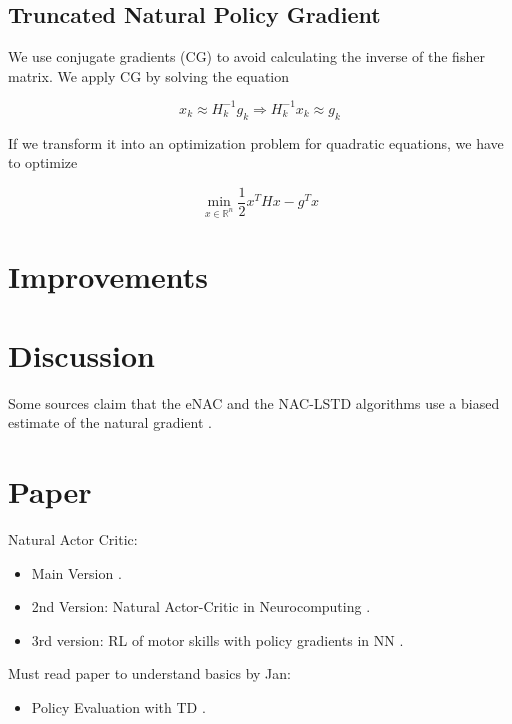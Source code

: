 	\subsection{Truncated Natural Policy Gradient}
	
	We use conjugate gradients (CG) to avoid calculating the inverse of the fisher matrix. We apply CG by solving the equation
	
	\begin{equation}
		x_k \approx H_k^{-1} g_k \Rightarrow H^{-1}_k x_k \approx g_k
	\end{equation}
	
	If we transform it into an optimization problem for quadratic equations, we have to optimize
	
	\begin{equation}
		\min_{x \in \mathbb{R}^n} \dfrac{1}{2} x^T H x - g^T x
	\end{equation}

\newpage
\section{Improvements}

\newpage
\section{Discussion}

Some sources claim that the eNAC and the NAC-LSTD algorithms use a biased estimate of the natural gradient \cite{thomas2014bias}.


\newpage
\section{Paper}
Natural Actor Critic:
\begin{itemize}
	\item Main Version \cite{peters2005natural}.
	\item 2nd Version: Natural Actor-Critic in Neurocomputing \cite{peters2008natural}.
	\item 3rd version: RL of motor skills with policy gradients in NN \cite{peters2008reinforcement}.
\end{itemize}

\noindent Must read paper to understand basics by Jan:
\begin{itemize}
	\item Policy Evaluation with TD \cite{dann2014policy}.
\end{itemize}

